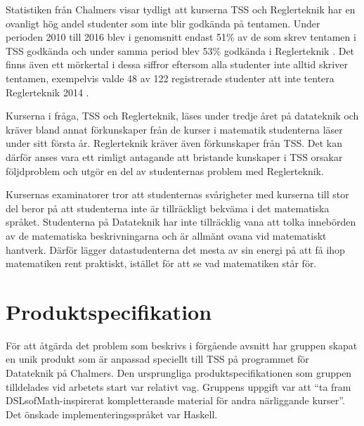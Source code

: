 \documentclass[]{article}
\begin{document}
Statistiken från Chalmers visar tydligt att kurserna TSS och Reglerteknik
har en ovanligt hög andel studenter som inte blir godkända på tentamen.
Under perioden 2010 till 2016 blev i genomsnitt endast 51\% av de som skrev
tentamen i TSS godkända och under samma period blev 53\% godkända i
Reglerteknik \cite{tentastatistik}.
Det finns även ett mörkertal i dessa siffror eftersom alla studenter
inte alltid skriver tentamen, exempelvis valde 48 av 122 registrerade
studenter att inte tentera Reglerteknik 2014
\cite{kursinformation:ere102:14-15}.

Kurserna i fråga, TSS och Reglerteknik, läses under tredje året på
datateknik och kräver bland annat förkunskaper från de kurser i matematik
studenterna läser under sitt första år. Reglerteknik kräver även förkunskaper
från TSS. Det kan därför anses vara ett rimligt antagande att bristande
kunskaper i TSS orsakar följdproblem och utgör en del av studenternas
problem med Reglerteknik.

Kursernas examinatorer tror att studenternas svårigheter med kurserna till
stor del beror på att studenterna inte är tillräckligt bekväma
i det matematiska språket. Studenterna på Datateknik har inte tillräcklig
vana att tolka innebörden av de matematiska beskrivningarna och är allmänt
ovana vid matematiskt hantverk. Därför lägger datastudenterna det mesta av
sin energi på att få ihop matematiken rent praktiskt,
istället för att se vad matematiken står för.

\section{Produktspecifikation}


För att åtgärda det problem som beskrivs i förgående avsnitt har gruppen skapat
en unik produkt som är anpassad speciellt till TSS på programmet för Datateknik
på Chalmers. Den ursprungliga produktspecifikationen som gruppen tilldelades vid
arbetets start var relativt vag. Gruppens uppgift var att ``ta fram
DSLsofMath-inspirerat kompletterande material för andra närliggande kurser''.
Det önskade implementeringsspråket var Haskell.
\end{document}
